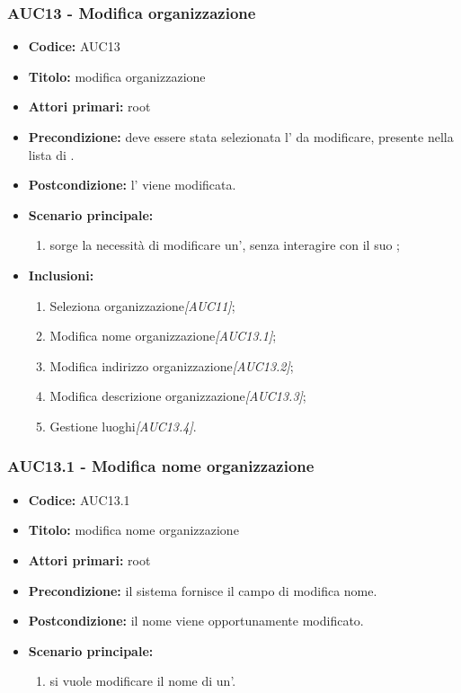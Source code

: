 \documentclass[casi-duso]{subfiles}
\begin{document}
\subsubsection{AUC13 - Modifica organizzazione}
\label{subsub:AUC13}
\begin{itemize}
  \item \textbf{Codice:} AUC13
  \item \textbf{Titolo:} modifica organizzazione
  \item \textbf{Attori primari:} root
  \item \textbf{Precondizione:} deve essere stata selezionata l' da modificare, presente nella lista di .
  \item \textbf{Postcondizione:} l' viene modificata.
  \item \textbf{Scenario principale:}
  \begin{enumerate}
    \item sorge la necessità di modificare un', senza interagire con il suo ;
  \end{enumerate}
  \item \textbf{Inclusioni:}
  \begin{enumerate}
    \item Seleziona organizzazione\emph{[AUC11]};
    \item Modifica nome organizzazione\emph{[AUC13.1]};
    \item Modifica indirizzo organizzazione\emph{[AUC13.2]};
    \item Modifica descrizione organizzazione\emph{[AUC13.3]};
    \item Gestione luoghi\emph{[AUC13.4]}.
  \end{enumerate}
\end{itemize}

\subsubsection{AUC13.1 - Modifica nome organizzazione}
\label{subsub:AUC13.1}
\begin{itemize}
  \item \textbf{Codice:} AUC13.1
  \item \textbf{Titolo:} modifica nome organizzazione
  \item \textbf{Attori primari:} root
  \item \textbf{Precondizione:} il sistema fornisce il campo di modifica nome.
  \item \textbf{Postcondizione:} il nome viene opportunamente modificato.
  \item \textbf{Scenario principale:} 
  \begin{enumerate}
    \item si vuole modificare il nome di un'.
  \end{enumerate}
  
\end{itemize}
\end{document}
